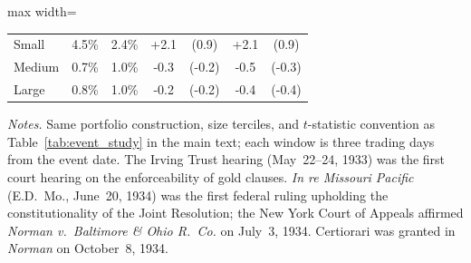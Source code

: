 \begin{table}[htbp]
\begin{adjustbox}{max width=\textwidth}
\begin{tabular}{lcccccc}
Small & 4.5\% & 2.4\% & +2.1 & (0.9) & +2.1 & (0.9) \\
Medium & 0.7\% & 1.0\% & -0.3 & (-0.2) & -0.5 & (-0.3) \\
Large & 0.8\% & 1.0\% & -0.2 & (-0.2) & -0.4 & (-0.4) \\
\bottomrule
\end{tabular}
\end{adjustbox}
\smallskip
\begin{minipage}{\textwidth}\scriptsize \textit{Notes.} Same portfolio construction, size terciles, and $t$-statistic convention as Table~\ref{tab:event_study} in the main text; each window is three trading days from the event date. The Irving Trust hearing (May~22--24, 1933) was the first court hearing on the enforceability of gold clauses. \textit{In re Missouri Pacific} (E.D.~Mo., June~20, 1934) was the first federal ruling upholding the constitutionality of the Joint Resolution; the New York Court of Appeals affirmed \textit{Norman v.\ Baltimore \& Ohio R.~Co.} on July~3, 1934. Certiorari was granted in \textit{Norman} on October~8, 1934.\end{minipage}
\end{table}

